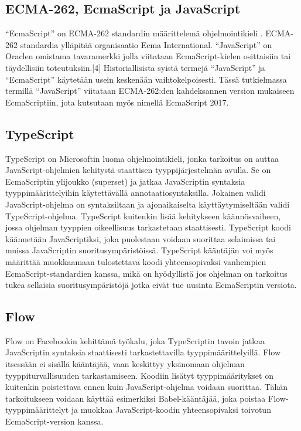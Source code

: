 \subsection{ECMA-262, EcmaScript ja JavaScript}
``EcmaScript'' on ECMA-262 standardin määrittelemä ohjelmointikieli
\cite{JavaScriptLanguageResources}\cite{Ecma262}.
ECMA-262 standardia ylläpitää organisaatio Ecma International. ``JavaScript''
on Oraclen omistama tavaramerkki jolla viitataan EcmaScript-kielen
osittaisiin tai täydellisiin toteutuksiin.[4] Historiallisista syistä termejä
``JavaScript'' ja ``EcmaScript'' käytetään usein keskenään vaihtokelpoisesti.
Tässä tutkielmassa termillä ``JavaScript'' viitataan ECMA-262:den kahdeksannen
version mukaiseen EcmaScriptiin, jota kutsutaan myös nimellä EcmaScript 2017.

\subsection{TypeScript}
TypeScript on Microsoftin luoma ohjelmointikieli, jonka tarkoitus on
auttaa JavaScript-ohjelmien kehitystä staattisen tyyppijärjestelmän avulla.
Se on EcmaScriptin ylijoukko (superset)\cite{TypeScriptSpec} ja jatkaa
JavaScriptin syntaksia tyyppimäärittelyihin käytettävällä
annotaatiosyntaksilla. Jokainen validi JavaScript-ohjelma on syntaksiltaan ja
ajonaikaiselta käyttäytymiseltään validi TypeScript-ohjelma. TypeScript
kuitenkin lisää kehitykseen käännösvaiheen, jossa ohjelman tyyppien
oikeellisuus tarkastetaan staattisesti. TypeScript koodi käännetään
JavaScriptiksi, joka puolestaan voidaan suorittaa selaimissa tai muissa
JavaScriptin suoritusympäristöissä. TypeScript kääntäjän voi myös määrittää
muokkaamaan tulostettava koodi yhteensopivaksi vanhempien
EcmaScript-standardien kanssa, mikä on hyödyllistä jos ohjelman on tarkoitus
tukea sellaisia suoritusympäristöjä jotka eivät tue uusinta EcmaScriptin
versiota.

\subsection{Flow}
Flow on Facebookin kehittämä työkalu, joka TypeScriptin tavoin jatkaa
JavaScriptin syntaksia staattisesti tarkastettavilla tyyppimäärittelyillä.
Flow itsessään ei sisällä kääntäjää, vaan keskittyy yksinomaan ohjelman
tyyppiturvallisuuden tarkastamiseen. Koodiin lisätyt tyyppimääritykset on
kuitenkin poistettava ennen kuin JavaScript-ohjelma voidaan suorittaa. Tähän
tarkoitukseen voidaan käyttää esimerkiksi Babel-kääntäjää, joka poistaa
Flow-tyyppimäärittelyt ja muokkaa JavaScript-koodin yhteensopivaksi toivotun
EcmaScript-version kanssa\cite{FlowInstallation}.

